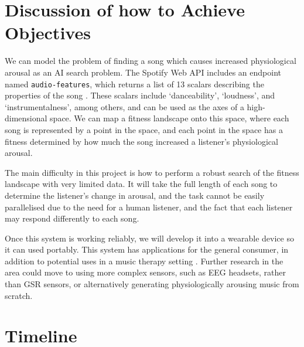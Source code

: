 \documentclass[a4paper,12pt]{article}
\begin{document}
	
	\section{Discussion of how to Achieve Objectives}
	
	We can model the problem of finding a song which causes increased physiological arousal as an AI search problem. The Spotify Web API includes an endpoint named \verb|audio-features|, which returns a list of 13 scalars describing the properties of the song \citep{audioFeatures}. These scalars include `danceability', `loudness', and `instrumentalness', among others, and can be used as the axes of a high-dimensional space. We can map a fitness landscape onto this space, where each song is represented by a point in the space, and each point in the space has a fitness determined by how much the song increased a listener's physiological arousal.

	The main difficulty in this project is how to perform a robust search of the fitness landscape with very limited data. It will take the full length of each song to determine the listener's change in arousal, and the task cannot be easily parallelised due to the need for a human listener, and the fact that each listener may respond differently to each song.
	
	Once this system is working reliably, we will develop it into a wearable device so it can used portably. This system has applications for the general consumer, in addition to potential uses in a music therapy setting \citep{musicTherapy}. Further research in the area could move to using more complex sensors, such as EEG headsets, rather than GSR sensors, or alternatively generating physiologically arousing music from scratch.
	
	\section{Timeline}
	
\end{document}
